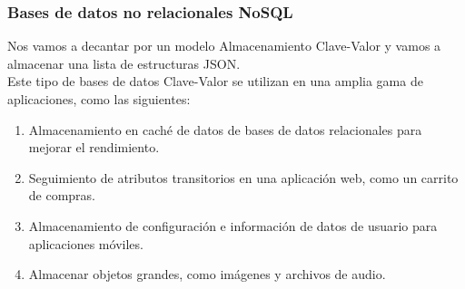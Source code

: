 \subsubsection{Bases de datos no relacionales NoSQL}
Nos vamos a decantar por un modelo Almacenamiento Clave-Valor
 y vamos a almacenar una lista de estructuras JSON.
\\
Este tipo de bases de datos Clave-Valor se utilizan en una amplia gama
 de aplicaciones, como las siguientes:
\begin{enumerate}
\item Almacenamiento en caché de datos de bases de datos 
relacionales para mejorar el rendimiento.
\item Seguimiento de atributos transitorios en una aplicación web, 
como un carrito de compras.
\item Almacenamiento de configuración e información de datos de usuario
 para aplicaciones móviles.
\item Almacenar objetos grandes, como imágenes y archivos de audio.
\end{enumerate}


